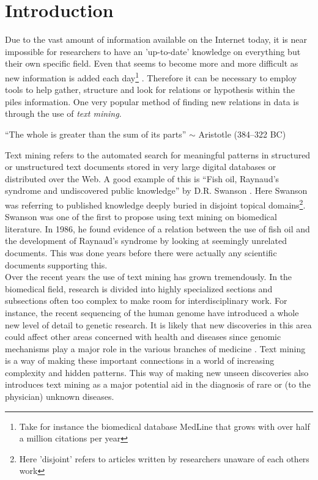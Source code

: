\chapter{Introduction\label{Introduction}}

Due to the vast amount of information available on the Internet today,
it is near impossible for researchers to have an 'up-to-date'
knowledge on everything but their own specific field. Even that seems
to become more and more difficult as new information is added each day\footnote{Take for instance the biomedical
  database MedLine that grows with over half a million citations per
  year}
\cite{CitAddMedLine}. Therefore it can be necessary to employ tools to help gather,
structure and look for relations or hypothesis within the piles
information. One very popular method of finding new relations in data
is through the use of \textit{text mining}.

\begin{center}
{\small``The whole is greater than the sum of its parts'' $\sim$ Aristotle
(384--322 BC)} 
\end{center}

Text mining refers to the automated search for meaningful patterns in
structured or unstructured text documents stored in very large digital
databases or distributed over the Web. A good example of this is
``Fish oil, Raynaud's syndrome and undiscovered public knowledge'' by
D.R. Swanson \cite{DRSwanson}. Here Swanson was referring to published
knowledge deeply buried in disjoint topical domains\footnote{Here
  'disjoint' refers to articles written by researchers unaware of each
  others work}. Swanson was one of the first to propose using text
mining on biomedical literature. In 1986, he found evidence of a
relation between the use of fish oil and the development of Raynaud's
syndrome by looking at seemingly unrelated documents. This was done
years before there were actually any scientific documents supporting
this. \\

Over the recent years the use of text mining has grown
tremendously. In the biomedical field, research is divided into highly
specialized sections and subsections often too complex to make room
for interdisciplinary work. For instance, the recent sequencing of the
human genome have introduced a whole new level of detail to genetic
research. It is likely that new discoveries in this area could affect
other areas concerned with health and diseases since genomic
mechanisms play a major role in the various branches of medicine
\cite{survey.biomed.text.cohen.2005}. Text mining is a way of making
these important connections in a world of increasing complexity and
hidden patterns. This way of making new unseen discoveries also
introduces text mining as a major potential aid in the diagnosis of
rare or (to the physician) unknown diseases.\\

